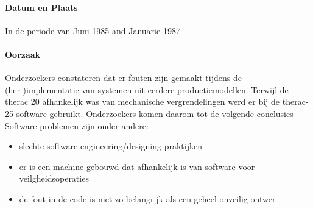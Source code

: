 \documentclass{article}
\begin{document}
	\paragraph{Datum en Plaats}
 In de periode van Juni 1985 and Januarie 1987 
	\paragraph{Oorzaak}
	\newline \indent  
%	
	Onderzoekers constateren dat er fouten zijn gemaakt tijdens de (her-)implementatie van systemen uit eerdere productiemodellen.  
Terwijl de therac 20 afhankelijk was van mechanische vergrendelingen werd er bij de therac-25 software gebruikt.
	Onderzoekers komen daarom tot de volgende conclusies
	Software problemen zijn onder andere:
	\begin{itemize}
		\item slechte software engineering/designing praktijken
		\item er is een machine gebouwd dat afhankelijk is van software voor veilgheidsoperaties
		\item de fout in de code is niet zo belangrijk als een geheel onveilig ontwer
	\end{itemize}
	
\end{document}
